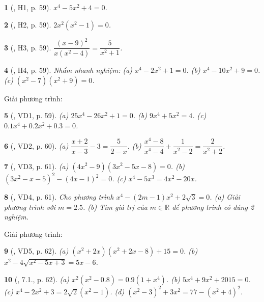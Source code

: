 \documentclass{article}
\newtheorem{baitoan}{}
\begin{document}
\begin{baitoan}[\cite{Binh_boi_duong_Toan_9_tap_2}, H1, p. 59]
	$x^4 - 5x^2 + 4 = 0$.
\end{baitoan}

\begin{baitoan}[\cite{Binh_boi_duong_Toan_9_tap_2}, H2, p. 59]
	$2x^2(x^2 - 1) = 0$.
\end{baitoan}

\begin{baitoan}[\cite{Binh_boi_duong_Toan_9_tap_2}, H3, p. 59]
	$\dfrac{(x - 9)^2}{x(x^2 - 4)} = \dfrac{5}{x^2 + 1}$.
\end{baitoan}

\begin{baitoan}[\cite{Binh_boi_duong_Toan_9_tap_2}, H4, p. 59]
	Nhẩm nhanh nghiệm: (a) $x^4 - 2x^2 + 1 = 0$. (b) $x^4 - 10x^2 + 9 = 0$. (c) $(x^2 - 7)(x^2 + 9) = 0$.
\end{baitoan}
Giải phương trình:

\begin{baitoan}[\cite{Binh_boi_duong_Toan_9_tap_2}, VD1, p. 59]
	(a) $25x^4 - 26x^2 + 1 = 0$. (b) $9x^4 + 5x^2 = 4$. (c) $0.1x^4 + 0.2x^2 + 0.3 = 0$.
\end{baitoan}

\begin{baitoan}[\cite{Binh_boi_duong_Toan_9_tap_2}, VD2, p. 60]
	(a) $\dfrac{x + 2}{x - 3} - 3 = \dfrac{5}{2 - x}$. (b) $\dfrac{x^4 - 8}{x^4 - 4} + \dfrac{1}{x^2 - 2} = \dfrac{2}{x^2 + 2}$.
\end{baitoan}

\begin{baitoan}[\cite{Binh_boi_duong_Toan_9_tap_2}, VD3, p. 61]
	(a) $(4x^2 - 9)(3x^2 - 5x - 8) = 0$. (b) $(3x^2 - x - 5)^2 - (4x - 1)^2 = 0$. (c) $x^4 - 5x^3 = 4x^2 - 20x$.
\end{baitoan}

\begin{baitoan}[\cite{Binh_boi_duong_Toan_9_tap_2}, VD4, p. 61]
	Cho phương trình $x^4 - (2m - 1)x^2 + 2\sqrt{3} = 0$. (a) Giải phương trình với $m = 2.5$. (b) Tìm giá trị của $m\in\mathbb{R}$ để phương trình có đúng 2 nghiệm.
\end{baitoan}
Giải phương trình:

\begin{baitoan}[\cite{Binh_boi_duong_Toan_9_tap_2}, VD5, p. 62]
	(a) $(x^2 + 2x)(x^2 + 2x - 8) + 15 = 0$. (b) $x^2 - 4\sqrt{x^2 - 5x + 3} = 5x - 6$.
\end{baitoan}

\begin{baitoan}[\cite{Binh_boi_duong_Toan_9_tap_2}, 7.1., p. 62]
	(a) $x^2(x^2 - 0.8) = 0.9(1 + x^4)$. (b) $5x^4 + 9x^2 + 2015 = 0$. (c) $x^4 - 2x^2 + 3 = 2\sqrt{2}(x^2 - 1)$. (d) $(x^2 - 3)^2 + 3x^2 = 77 - (x^2 + 4)^2$.
\end{baitoan}
\end{document}
